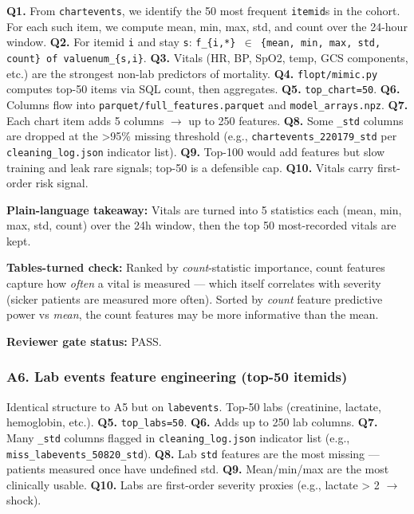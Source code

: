 \documentclass{article}
\begin{document}
\textbf{Q1.} From \texttt{chartevents}, we identify the 50 most frequent \texttt{itemid}s in the cohort. For each such item, we compute mean, min, max, std, and count over the 24-hour window. \textbf{Q2.} For itemid \texttt{i} and stay \texttt{s}: \texttt{f\_\{i,*\} \ensuremath{\in} \{mean, min, max, std, count\} of valuenum\_\{s,i\}}. \textbf{Q3.} Vitals (HR, BP, SpO2, temp, GCS components, etc.) are the strongest non-lab predictors of mortality. \textbf{Q4.} \texttt{flopt/mimic.py} computes top-50 items via SQL count, then aggregates. \textbf{Q5.} \texttt{top\_chart=50}. \textbf{Q6.} Columns flow into \texttt{parquet/full\_features.parquet} and \texttt{model\_arrays.npz}. \textbf{Q7.} Each chart item adds 5 columns \ensuremath{\rightarrow} up to 250 features. \textbf{Q8.} Some \texttt{\_std} columns are dropped at the >95\% missing threshold (e.g., \texttt{chartevents\_220179\_std} per \texttt{cleaning\_log.json} indicator list). \textbf{Q9.} Top-100 would add features but slow training and leak rare signals; top-50 is a defensible cap. \textbf{Q10.} Vitals carry first-order risk signal.


\textbf{Plain-language takeaway:} Vitals are turned into 5 statistics each (mean, min, max, std, count) over the 24h window, then the top 50 most-recorded vitals are kept.


\textbf{Tables-turned check:} Ranked by \emph{count}-statistic importance, count features capture how \emph{often} a vital is measured --- which itself correlates with severity (sicker patients are measured more often). Sorted by \emph{count} feature predictive power vs \emph{mean}, the count features may be more informative than the mean.


\textbf{Reviewer gate status:} PASS.


\subsubsection{A6. Lab events feature engineering (top-50 itemids)}


Identical structure to A5 but on \texttt{labevents}. Top-50 labs (creatinine, lactate, hemoglobin, etc.). \textbf{Q5.} \texttt{top\_labs=50}. \textbf{Q6.} Adds up to 250 lab columns. \textbf{Q7.} Many \texttt{\_std} columns flagged in \texttt{cleaning\_log.json} indicator list (e.g., \texttt{miss\_labevents\_50820\_std}). \textbf{Q8.} Lab \texttt{std} features are the most missing --- patients measured once have undefined std. \textbf{Q9.} Mean/min/max are the most clinically usable. \textbf{Q10.} Labs are first-order severity proxies (e.g., lactate > 2 \ensuremath{\rightarrow} shock).
\end{document}
